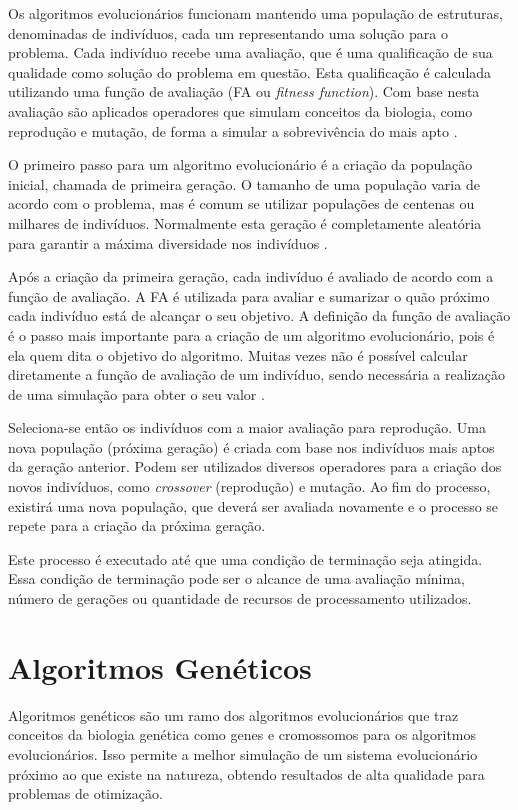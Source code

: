 \documentclass[12pt,oneside,a4paper,english,french,spanish,brazil,]{abntex2}
\begin{document}
Os algoritmos evolucionários funcionam mantendo uma população de estruturas, denominadas de indivíduos, cada um representando uma solução para o problema. Cada indivíduo recebe uma avaliação, que é uma qualificação de sua qualidade como solução do problema em questão. Esta qualificação é calculada utilizando uma função de avaliação (FA ou \textit{fitness function}). Com base nesta avaliação são aplicados operadores que simulam conceitos da biologia, como reprodução e mutação, de forma a simular a sobrevivência do mais apto \cite{linden:2008}.

O primeiro passo para um algoritmo evolucionário é a criação da população inicial, chamada de primeira geração. O tamanho de uma população varia de acordo com o problema, mas é comum se utilizar populações de centenas ou milhares de indivíduos. Normalmente esta geração é completamente aleatória para garantir a máxima diversidade nos indivíduos \cite{linden:2008}.

Após a criação da primeira geração, cada indivíduo é avaliado de acordo com a função de avaliação. A FA é utilizada para avaliar e sumarizar o quão próximo cada indivíduo está de alcançar o seu objetivo. A definição da função de avaliação é o passo mais importante para a criação de um algoritmo evolucionário, pois é ela quem dita o objetivo do algoritmo. Muitas vezes não é possível calcular diretamente a função de avaliação de um indivíduo, sendo necessária a realização de uma simulação para obter o seu valor \cite{linden:2008}.

Seleciona-se então os indivíduos com a maior avaliação para reprodução. Uma nova população (próxima geração) é criada com base nos indivíduos mais aptos da geração anterior. Podem ser utilizados diversos operadores para a criação dos novos indivíduos, como \textit{crossover} (reprodução) e mutação. Ao fim do processo, existirá uma nova população, que deverá ser avaliada novamente e o processo se repete para a criação da próxima geração.

Este processo é executado até que uma condição de terminação seja atingida. Essa condição de terminação pode ser o alcance de uma avaliação mínima, número de gerações ou quantidade de recursos de processamento utilizados.

\section{Algoritmos Genéticos}

Algoritmos genéticos são um ramo dos algoritmos evolucionários que traz conceitos da biologia genética como genes e cromossomos para os algoritmos evolucionários. Isso permite a melhor simulação de um sistema evolucionário próximo ao que existe na natureza, obtendo resultados de alta qualidade para problemas de otimização.
\end{document}
